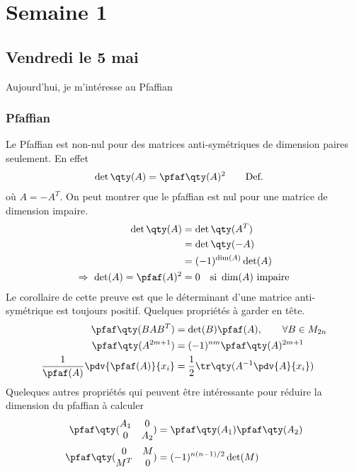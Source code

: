 \documentclass{subfiles}[../main.tex]
\begin{document}
    \section{Semaine 1} %
    \label{sec:Semaine 1}

        \subsection{Vendredi le 5 mai} %
        \label{sub:Vendredi le 5 mai}
            Aujourd'hui, je m'intéresse au Pfaffian
            \subsubsection{Pfaffian} %
            \label{ssub:Pfaffian}
                Le Pfaffian est non-nul pour des matrices anti-symétriques de
                dimension paires seulement. En effet
                \begin{align}
                    \det\qty(A)&=\pfaf\qty(A)^2\qquad\text{Def.}
                \end{align}
                où $A=-A^{T}$. On peut montrer que le pfaffian est nul pour une
                matrice de dimension impaire.
                \begin{align}
                    \det\qty(A)&=\det\qty(A^T)\\
                    &=\det\qty(-A)\\
                    &=(-1)^{\dim(A)}\det(A)\\
                    \Rightarrow\ \det(A)=\pfaf(A)^2&=0\quad\text{si}\ \dim(A)\ \text{impaire}
                \end{align}
                Le corollaire de cette preuve est que le déterminant d'une matrice
                anti-symétrique est toujours positif. Quelques propriétés à
                garder en tête.
                \begin{align}
                    \pfaf\qty(BAB^T)&=\det(B)\pfaf(A),\qquad\forall B\in M_{2n}\\
                    \pfaf\qty(A^{2m+1})&=(-1)^{nm}\pfaf\qty(A)^{2m+1}\\
                    \frac1{\pfaf(A)}\pdv{\pfaf(A)}{x_i}&=
                    \frac12\tr\qty(A^{-1}\pdv{A}{x_i})
                \end{align}
                Queleques autres propriétés qui peuvent être intéressante pour
                réduire la dimension du pfaffian à calculer
                \begin{align}
                    \pfaf\qty(
                    \begin{matrix}
                        A_1&0\\0&A_2
                    \end{matrix}
                    )&=\pfaf\qty(A_1)\pfaf\qty(A_2)\\
                    \pfaf\qty(
                    \begin{matrix}
                        0&M\\ M^T&0
                    \end{matrix}
                    )&=(-1)^{n(n-1)/2}\det(M)
                \end{align}
\end{document}
